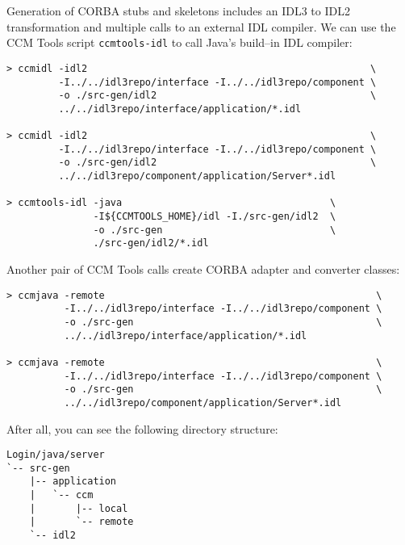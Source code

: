 \vspace{3mm}
Generation of CORBA stubs and skeletons includes an IDL3 to IDL2 transformation
and multiple calls to an external IDL compiler. We can use the CCM Tools script
{\tt ccmtools-idl} to call Java's build--in IDL compiler:
\begin{footnotesize}
\begin{verbatim}
> ccmidl -idl2                                                 \
         -I../../idl3repo/interface -I../../idl3repo/component \ 
         -o ./src-gen/idl2                                     \
         ../../idl3repo/interface/application/*.idl

> ccmidl -idl2                                                 \ 
         -I../../idl3repo/interface -I../../idl3repo/component \
         -o ./src-gen/idl2                                     \
         ../../idl3repo/component/application/Server*.idl

> ccmtools-idl -java                                    \
               -I${CCMTOOLS_HOME}/idl -I./src-gen/idl2  \ 
               -o ./src-gen                             \
               ./src-gen/idl2/*.idl
\end{verbatim}
\end{footnotesize}

Another pair of CCM Tools calls create CORBA adapter and converter classes:
\begin{footnotesize}
\begin{verbatim}
> ccmjava -remote                                               \
          -I../../idl3repo/interface -I../../idl3repo/component \
          -o ./src-gen                                          \
          ../../idl3repo/interface/application/*.idl 

> ccmjava -remote                                               \
          -I../../idl3repo/interface -I../../idl3repo/component \ 
          -o ./src-gen                                          \
          ../../idl3repo/component/application/Server*.idl
\end{verbatim}
\end{footnotesize}

After all, you can see the following directory structure: 
\begin{footnotesize}
\begin{verbatim}
Login/java/server
`-- src-gen
    |-- application
    |   `-- ccm
    |       |-- local
    |       `-- remote
    `-- idl2
\end{verbatim}
\end{footnotesize}

